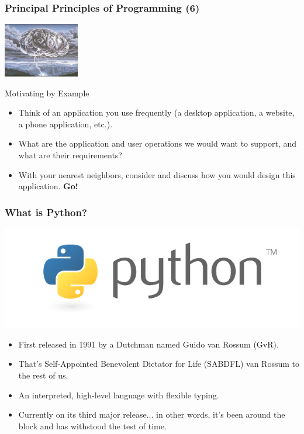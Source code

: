 \documentclass[10pt]{beamer}
\begin{document}
\begin{frame}
  \frametitle{Principal Principles of Programming (6)}
  \centering
  \vspace{10px}
  \includegraphics[width=125px]{Brainstorm.jpg}
  \vspace{5px}
  \begin{block}{Motivating by Example}
    \begin{itemize}
      \item Think of an application you use frequently (a desktop application, a website, a phone application, etc.).
      \item What are the application and user operations we would want to support, and what are their requirements?
      \item With your nearest neighbors, consider and discuss how you would design this application.
        \textbf{Go!}
    \end{itemize}
  \end{block}
\end{frame}

\begin{frame}
  \frametitle{What is Python?}
  \centering
  \includegraphics[scale=0.5]{PythonLogo.png} \\
  \begin{itemize}
    \item First released in 1991 by a Dutchman named Guido van Rossum (GvR).
    \item That's Self-Appointed Benevolent Dictator for Life (SABDFL) van Rossum to the rest of us.
    \item An interpreted, high-level language with flexible typing.
    \item Currently on its third major release... in other words, it's been around the block and has withstood the test of time.
  \end{itemize}
\end{frame}
\end{document}
